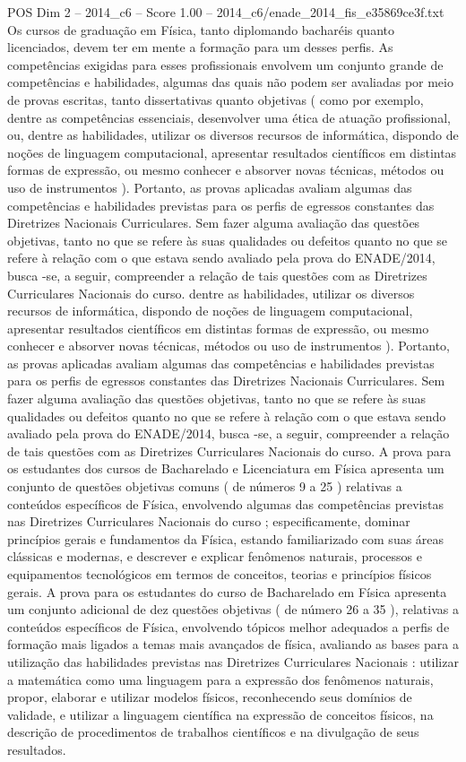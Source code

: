 \begin{textsample}{POS Dim 2 – 2014\_c6 – Score 1.00 – 2014\_c6/enade\_2014\_fis\_e35869ce3f.txt}
Os cursos de graduação em Física, tanto diplomando bacharéis quanto licenciados, devem ter em mente a formação para um desses perfis.
As competências exigidas para esses profissionais envolvem um conjunto grande de competências e habilidades, algumas das quais não podem ser avaliadas por meio de provas escritas, tanto dissertativas quanto objetivas ( como por exemplo, dentre as competências essenciais, desenvolver uma ética de atuação profissional, ou, dentre as habilidades, utilizar os diversos recursos de informática, dispondo de noções de linguagem computacional, apresentar resultados científicos em distintas formas de expressão, ou mesmo conhecer e absorver novas técnicas, métodos ou uso de instrumentos ).
Portanto, as provas aplicadas avaliam algumas das competências e habilidades previstas para os perfis de egressos constantes das Diretrizes Nacionais Curriculares.
Sem fazer alguma avaliação das questões objetivas, tanto no que se refere às suas qualidades ou defeitos quanto no que se refere à relação com o que estava sendo avaliado pela prova do ENADE/2014, busca -se, a seguir, compreender a relação de tais questões com as Diretrizes Curriculares Nacionais do curso. dentre as habilidades, utilizar os diversos recursos de informática, dispondo de noções de linguagem computacional, apresentar resultados científicos em distintas formas de expressão, ou mesmo conhecer e absorver novas técnicas, métodos ou uso de instrumentos ).
Portanto, as provas aplicadas avaliam algumas das competências e habilidades previstas para os perfis de egressos constantes das Diretrizes Nacionais Curriculares.
Sem fazer alguma avaliação das questões objetivas, tanto no que se refere às suas qualidades ou defeitos quanto no que se refere à relação com o que estava sendo avaliado pela prova do ENADE/2014, busca -se, a seguir, compreender a relação de tais questões com as Diretrizes Curriculares Nacionais do curso.
A prova para os estudantes dos cursos de Bacharelado e Licenciatura em Física apresenta um conjunto de questões objetivas comuns ( de números 9 a 25 ) relativas a conteúdos específicos de Física, envolvendo algumas das competências previstas nas Diretrizes Curriculares Nacionais do curso ; especificamente, dominar princípios gerais e fundamentos da Física, estando familiarizado com suas áreas clássicas e modernas, e descrever e explicar fenômenos naturais, processos e equipamentos tecnológicos em termos de conceitos, teorias e princípios físicos gerais.
A prova para os estudantes do curso de Bacharelado em Física apresenta um conjunto adicional de dez questões objetivas ( de número 26 a 35 ), relativas a conteúdos específicos de Física, envolvendo tópicos melhor adequados a perfis de formação mais ligados a temas mais avançados de física, avaliando as bases para a utilização das habilidades previstas nas Diretrizes Curriculares Nacionais : utilizar a matemática como uma linguagem para a expressão dos fenômenos naturais, propor, elaborar e utilizar modelos físicos, reconhecendo seus domínios de validade, e utilizar a linguagem científica na expressão de conceitos físicos, na descrição de procedimentos de trabalhos científicos e na divulgação de seus resultados.

\end{textsample}
